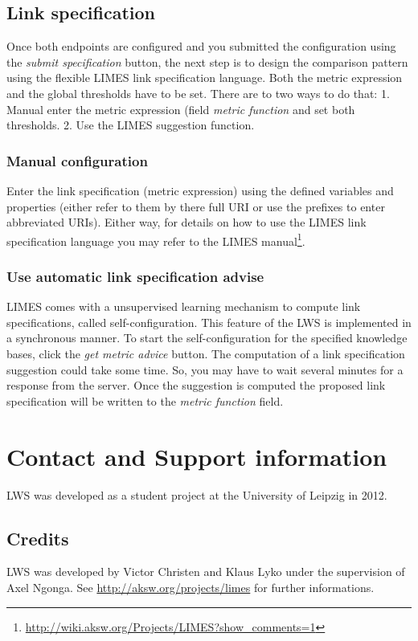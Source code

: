 \documentclass{article}
\begin{document}
\subsection{Link specification}
Once both endpoints are configured and you submitted the configuration using the \textit{submit specification}  button, the next step is to design the comparison pattern using the flexible LIMES link specification language. Both the metric expression and the global thresholds have to be set. There are to two ways to do that: 1. Manual enter the metric expression (field \textit{metric function} and set both thresholds. 2. Use the LIMES suggestion function.\\
\subsubsection{Manual configuration}
Enter the link specification (metric expression) using the defined variables and properties (either refer to them by there full URI or use the prefixes to enter abbreviated URIs). Either way, for details on how to use the LIMES link specification language you may refer to the LIMES manual\footnote{\url{http://wiki.aksw.org/Projects/LIMES?show_comments=1}}.
\subsubsection{Use automatic link specification advise}
LIMES comes with a unsupervised learning mechanism to compute link specifications, called self-configuration. This feature of the LWS is implemented in a synchronous manner. To start the self-configuration for the specified knowledge bases, click the \textit{get metric advice} button. The computation of a link specification suggestion could take some time. So, you may have to wait several minutes for a response from the server. Once the suggestion is computed the proposed link specification will be written to the \textit{metric function} field.

\section{Contact and Support information}
LWS was developed as a student project at the University of Leipzig in 2012.

\subsection{Credits}
LWS was developed by Victor Christen and Klaus Lyko under the supervision of Axel Ngonga. See \url{http://aksw.org/projects/limes} for further informations.
\end{document}
